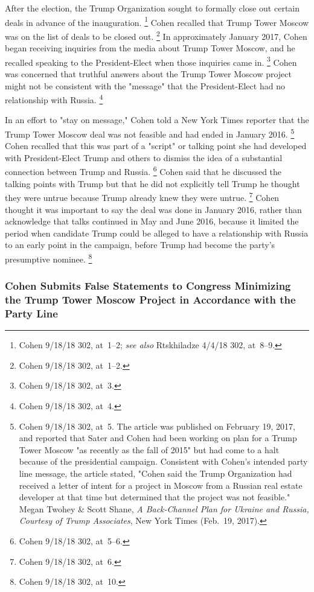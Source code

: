 {After the election, the Trump Organization sought to formally close out certain deals in advance of the inauguration.%
\footnote{Cohen 9/18/18 302, at~1--2;
\textit{see also} Rtskhiladze 4/4/18 302, at~8--9.}
Cohen recalled that Trump Tower Moscow was on the list of deals to be closed out.%
\footnote{Cohen 9/18/18 302, at~1--2.}
In approximately January 2017, Cohen began receiving inquiries from the media about Trump Tower Moscow, and he recalled speaking to the President-Elect when those inquiries came in.%
\footnote{Cohen 9/18/18 302, at~3.}
Cohen was concerned that truthful answers about the Trump Tower Moscow project might not be consistent with the "message" that the President-Elect had no relationship with Russia.%
\footnote{Cohen 9/18/18 302, at~4.}

In an effort to "stay on message," Cohen told a New York Times reporter that the Trump Tower Moscow deal was not feasible and had ended in January 2016.%
\footnote{Cohen 9/18/18 302, at~5.
The article was published on February 19, 2017, and reported that Sater and Cohen had been working on plan for a Trump Tower Moscow "as recently as the fall of 2015" but had come to a halt because of the presidential campaign.
Consistent with Cohen's intended party line message, the article stated, "Cohen said the Trump Organization had received a letter of intent for a project in Moscow from a Russian real estate developer at that time but determined that the project was not feasible."
Megan Twohey \& Scott Shane, \textit{A Back-Channel Plan for Ukraine and Russia, Courtesy of Trump Associates}, New York Times (Feb.~19, 2017).}
Cohen recalled that this was part of a "script" or talking point she had developed with President-Elect Trump and others to dismiss the idea of a substantial connection between Trump and Russia.%
\footnote{Cohen 9/18/18 302, at~5--6.}
Cohen said that he discussed the talking points with Trump but that he did not explicitly tell Trump he thought they were untrue because Trump already knew they were untrue.%
\footnote{Cohen 9/18/18 302, at~6.}
Cohen thought it was important to say the deal was done in January 2016, rather than acknowledge that talks continued in May and June 2016, because it limited the period when candidate Trump could be alleged to have a relationship with Russia to an early point in the campaign, before Trump had become the party's presumptive nominee.%
\footnote{Cohen 9/18/18 302, at~10.}

\subsubsection{Cohen Submits False Statements to Congress Minimizing the Trump Tower Moscow Project in Accordance with the Party Line}

}
